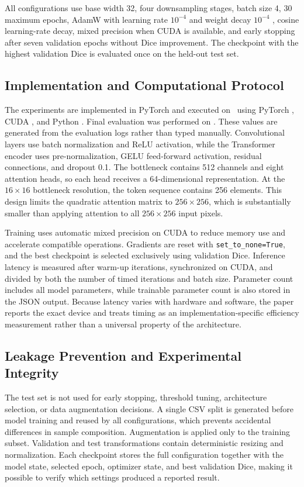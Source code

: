 \documentclass[a4paper,10pt]{article}
\begin{document}
All configurations use base width 32, four downsampling stages, batch size 4, 30 maximum epochs, AdamW with learning rate $10^{-4}$ and weight decay $10^{-4}$ \cite{loshchilov2019adamw}, cosine learning-rate decay, mixed precision when CUDA is available, and early stopping after seven validation epochs without Dice improvement. The checkpoint with the highest validation Dice is evaluated once on the held-out test set.

\subsection{Implementation and Computational Protocol}

The experiments are implemented in PyTorch and executed on \HardwareName~using PyTorch \TorchVersion, CUDA \CudaVersion, and Python \PythonVersion. Final evaluation was performed on \EvaluationDate. These values are generated from the evaluation logs rather than typed manually. Convolutional layers use batch normalization and ReLU activation, while the Transformer encoder uses pre-normalization, GELU feed-forward activation, residual connections, and dropout 0.1. The bottleneck contains 512 channels and eight attention heads, so each head receives a 64-dimensional representation. At the $16\times16$ bottleneck resolution, the token sequence contains 256 elements. This design limits the quadratic attention matrix to $256\times256$, which is substantially smaller than applying attention to all $256\times256$ input pixels.

Training uses automatic mixed precision on CUDA to reduce memory use and accelerate compatible operations. Gradients are reset with \texttt{set\_to\_none=True}, and the best checkpoint is selected exclusively using validation Dice. Inference latency is measured after warm-up iterations, synchronized on CUDA, and divided by both the number of timed iterations and batch size. Parameter count includes all model parameters, while trainable parameter count is also stored in the JSON output. Because latency varies with hardware and software, the paper reports the exact device and treats timing as an implementation-specific efficiency measurement rather than a universal property of the architecture.

\subsection{Leakage Prevention and Experimental Integrity}

The test set is not used for early stopping, threshold tuning, architecture selection, or data augmentation decisions. A single CSV split is generated before model training and reused by all configurations, which prevents accidental differences in sample composition. Augmentation is applied only to the training subset. Validation and test transformations contain deterministic resizing and normalization. Each checkpoint stores the full configuration together with the model state, selected epoch, optimizer state, and best validation Dice, making it possible to verify which settings produced a reported result.
\end{document}
